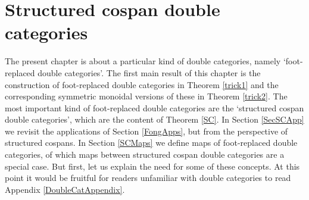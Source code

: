 \documentclass[oneside,final]{ucr}
\theoremstyle{definition}
\begin{document}
{\ssp
\chapter{Structured cospan double categories}\label{Chapter3}
The present chapter is about a particular kind of double categories, namely `foot-replaced double categories'. The first main result of this chapter is the construction of foot-replaced double categories in Theorem \ref{trick1} and the corresponding symmetric monoidal versions of these in Theorem \ref{trick2}. 
The most important kind of foot-replaced double categories are the `structured cospan double categories', which are the content of Theorem \ref{SC}. In Section \ref{SecSCApp} we revisit the applications of Section \ref{FongApps}, but from the perspective of structured cospans. In Section \ref{SCMaps} we define maps of foot-replaced double categories, of which maps between structured cospan double categories are a special case. But first, let us explain the need for some of these concepts. At this point it would be fruitful for readers unfamiliar with double categories to read Appendix \ref{DoubleCatAppendix}.

}
\end{document}
